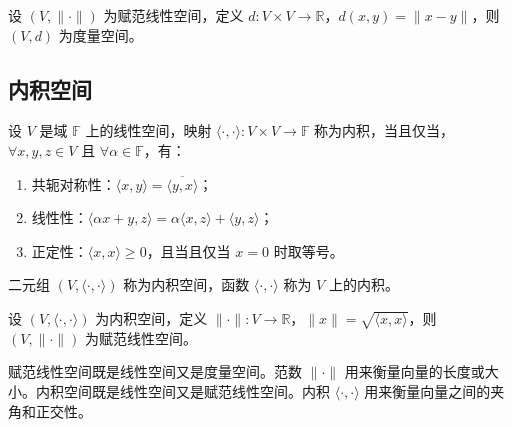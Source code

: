 \begin{proposition}[赋范线性空间诱导的度量]
    设 $ (V,\|\cdot\|) $ 为赋范线性空间，定义 $ d:V\times V\to \mathbb{R} $，$ d(x,y)=\|x-y\| $，则 $ (V,d) $ 为度量空间。
\end{proposition}

\vspace{1em}

\subsection{内积空间}

\begin{definition}
    设 $ V $ 是域 $ \mathbb{F} $ 上的线性空间，映射 $ \langle\cdot,\cdot\rangle:V\times V\to \mathbb{F} $ 称为内积，当且仅当，$ \forall x,y,z\in V $ 且 $ \forall \alpha\in \mathbb{F} $，有：
    \begin{enumerate}
        \item 共轭对称性：$ \langle x,y\rangle=\overline{\langle y,x\rangle} $；
        \item 线性性：$ \langle \alpha x+y,z\rangle=\alpha\langle x,z\rangle+\langle y,z\rangle $；
        \item 正定性：$ \langle x,x\rangle\geq 0 $，且当且仅当 $ x=0 $ 时取等号。
    \end{enumerate}
    二元组 $ (V,\langle\cdot,\cdot\rangle) $ 称为内积空间，函数 $ \langle\cdot,\cdot\rangle $ 称为 $ V $ 上的内积。
\end{definition}
\vspace{1em}

\begin{proposition}[内积空间诱导的赋范线性空间]
    设 $ (V,\langle\cdot,\cdot\rangle) $ 为内积空间，定义 $ \|\cdot\|:V\to \mathbb{R} $，$ \|x\|=\sqrt{\langle x,x\rangle} $，则 $ (V,\|\cdot\|) $ 为赋范线性空间。
\end{proposition}
\vspace{1em}

\begin{note}
    赋范线性空间既是线性空间又是度量空间。范数 $ \|\cdot\| $ 用来衡量向量的长度或大小。内积空间既是线性空间又是赋范线性空间。内积 $ \langle\cdot,\cdot\rangle $ 用来衡量向量之间的夹角和正交性。
\end{note}


